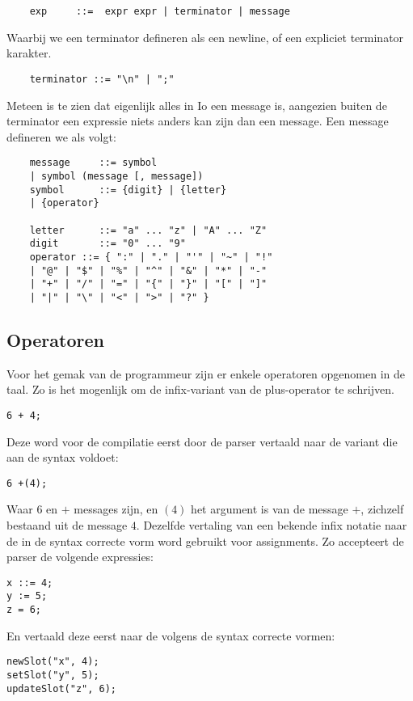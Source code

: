 \documentclass[12pt]{article}
\begin{document}
\begin{lstlisting}
	exp		::=  expr expr | terminator | message 
	\end{lstlisting}
	
Waarbij we een terminator defineren als een newline, of een expliciet terminator karakter.
\begin{lstlisting}
	terminator ::= "\n" | ";"
\end{lstlisting}
Meteen is te zien dat eigenlijk alles in Io een message is, aangezien buiten de terminator een expressie niets anders kan zijn dan een message. Een message defineren we als volgt:

\begin{lstlisting}
	message		::= symbol 
	| symbol (message [, message])
	symbol		::= {digit} | {letter} 
	| {operator}
	
	letter 		::= "a" ... "z" | "A" ... "Z"
	digit 		::= "0" ... "9"
	operator ::= { ":" | "." | "'" | "~" | "!" 
	| "@" | "$" | "%" | "^" | "&" | "*" | "-" 
	| "+" | "/"	| "=" | "{" | "}" | "[" | "]" 
	| "|" | "\" | "<" | ">" | "?" }
\end{lstlisting}

\subsection{Operatoren}
Voor het gemak van de programmeur zijn er enkele operatoren opgenomen in de taal. Zo is het mogenlijk om de infix-variant van de plus-operator te schrijven.
\begin{lstlisting}[frame=single]
6 + 4;
\end{lstlisting}
Deze word voor de compilatie eerst door de parser vertaald naar de variant die aan de syntax voldoet:
\begin{lstlisting}[frame=single]
6 +(4);
\end{lstlisting}
Waar \(6\) en \(+\) messages zijn, en \( (4) \) het argument is van de message \(+\), zichzelf bestaand uit de message \(4\). Dezelfde vertaling van een bekende infix notatie naar de in de syntax correcte vorm word gebruikt voor assignments. Zo accepteert de parser de volgende expressies:
\begin{lstlisting}[frame=single]
x ::= 4;
y := 5;
z = 6;
\end{lstlisting}
En vertaald deze eerst naar de volgens de syntax correcte vormen:
\begin{lstlisting}[frame=single]
newSlot("x", 4);
setSlot("y", 5);
updateSlot("z", 6);
\end{lstlisting}
\end{document}
